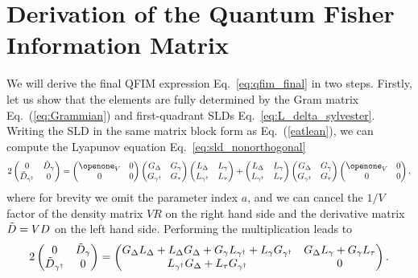 \documentclass[reprint,amsmath,amssymb,aps,prl,floatfix,groupedaddress,superscriptaddress]{revtex4-2}
\begin{document}
\section{Derivation of the Quantum Fisher Information Matrix\label{app:qfi_derivation}}
We will derive the final QFIM expression Eq.~\eqref{eq:qfim_final} in two steps. Firstly, let us show that the elements are fully determined by the Gram matrix Eq.~(\ref{eq:Grammian})
and first-quadrant SLDs Eq.~\eqref{eq:L_delta_sylvester}. Writing the SLD in the same matrix block form as Eq.~(\ref{eatlean}), we can compute the Lyapunov equation Eq.~\eqref{eq:sld_nonorthogonal}
\begin{align}
    2 \begin{pmatrix}
        0 & \Tilde{D}_\gamma \\
        \Tilde{D}_{\gamma^\dagger} & 0
    \end{pmatrix} = \begin{pmatrix}
        \openone_V & 0 \\
        0 & 0
    \end{pmatrix} \begin{pmatrix}
        G_\Delta & G_\gamma \\
        G_{\gamma^\dagger} & G_{\tau}
    \end{pmatrix} \begin{pmatrix}
        L_\Delta & L_\gamma \\
        L_{\gamma^\dagger} & L_{\tau}
    \end{pmatrix} + \begin{pmatrix}
        L_\Delta & L_\gamma \\
        L_{\gamma^\dagger} & L_{\tau}
    \end{pmatrix} \begin{pmatrix}
        G_\Delta & G_\gamma \\
        G_{\gamma^\dagger} & G_{\tau}
    \end{pmatrix} \begin{pmatrix}
        \openone_V & 0 \\
        0 & 0
    \end{pmatrix},
\end{align}
where for brevity we omit the parameter index $a$, and we can cancel the $1/V$ factor of the density matrix $V R$ on the right hand side and the derivative matrix $\Tilde{D} = V D$ on the left hand side. Performing the multiplication leads to
\begin{align}
    2 \begin{pmatrix}
        0 & \Tilde{D}_\gamma \\
        \Tilde{D}_{\gamma^\dagger} & 0
    \end{pmatrix} = \begin{pmatrix}
        G_\Delta L_\Delta + L_\Delta G_\Delta + G_\gamma L_{\gamma^\dagger} + L_\gamma G_{\gamma^\dagger} & G_\Delta L_\gamma + G_\gamma L_\tau \\
        L_{\gamma^\dagger} G_\Delta + L_\tau G_{\gamma^\dagger} & 0
    \end{pmatrix}.
\end{align}
\end{document}
